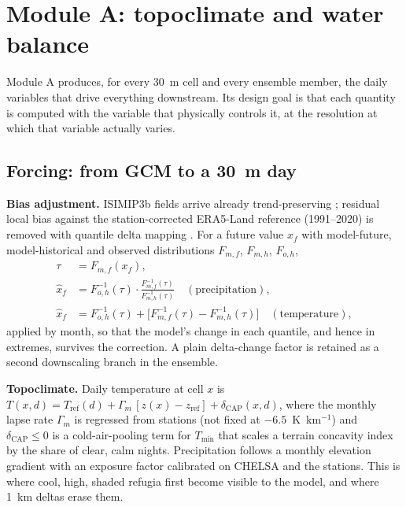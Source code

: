 \section{Module A: topoclimate and water balance}\label{sec:A}

Module A produces, for every 30~m cell and every ensemble member, the daily variables that drive everything downstream. Its design goal is that each quantity is computed with the variable that physically controls it, at the resolution at which that variable actually varies.

\subsection{Forcing: from GCM to a 30~m day}
\textbf{Bias adjustment.} ISIMIP3b fields arrive already trend-preserving \citep{Lange2019}; residual local bias against the station-corrected ERA5-Land reference (1991--2020) is removed with quantile delta mapping \citep{Cannon2015}. For a future value $x_f$ with model-future, model-historical and observed distributions $F_{m,f}$, $F_{m,h}$, $F_{o,h}$,
\begin{equation}\label{eq:qdm}
\begin{aligned}
\tau&=F_{m,f}(x_f),\\
\hat x_f&=F_{o,h}^{-1}(\tau)\cdot\frac{F_{m,f}^{-1}(\tau)}{F_{m,h}^{-1}(\tau)}\quad(\text{precipitation}),\\
\hat x_f&=F_{o,h}^{-1}(\tau)+\big[F_{m,f}^{-1}(\tau)-F_{m,h}^{-1}(\tau)\big]\quad(\text{temperature}),
\end{aligned}
\end{equation}
applied by month, so that the model's change in each quantile, and hence in extremes, survives the correction. A plain delta-change factor is retained as a second downscaling branch in the ensemble.

\textbf{Topoclimate.} Daily temperature at cell $x$ is $T(x,d)=T_{\text{ref}}(d)+\Gamma_m\,[z(x)-z_{\text{ref}}]+\delta_{\text{CAP}}(x,d)$, where the monthly lapse rate $\Gamma_m$ is regressed from stations (not fixed at $-6.5$~K~km$^{-1}$) and $\delta_{\text{CAP}}\le0$ is a cold-air-pooling term for $T_{\min}$ that scales a terrain concavity index by the share of clear, calm nights. Precipitation follows a monthly elevation gradient with an exposure factor calibrated on CHELSA and the stations. This is where cool, high, shaded refugia first become visible to the model, and where 1~km deltas erase them.

